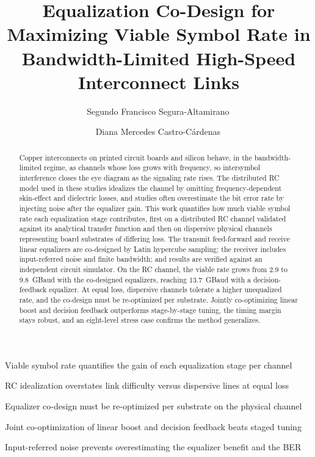 \documentclass[preprint,review,12pt]{elsarticle}
\begin{document}
\begin{frontmatter}

\title{Equalization Co-Design for Maximizing Viable Symbol Rate in Bandwidth-Limited High-Speed Interconnect Links}

\author[inst1]{Segundo Francisco Segura-Altamirano\,}

\author[inst1]{Diana Mercedes Castro-C\'ardenas\,}



\begin{abstract}
Copper interconnects on printed circuit boards and silicon behave, in the
bandwidth-limited regime, as channels whose loss grows with frequency, so
intersymbol interference closes the eye diagram as the signaling rate
rises. The distributed RC model used in these studies idealizes the
channel by omitting frequency-dependent skin-effect and dielectric losses,
and studies often overestimate the bit error rate by injecting noise after
the equalizer gain. This work quantifies how much viable symbol rate each
equalization stage contributes, first on a distributed RC channel
validated against its analytical transfer function and then on dispersive
physical channels representing board substrates of differing loss. The
transmit feed-forward and receive linear equalizers are co-designed by
Latin hypercube sampling; the receiver includes input-referred noise and
finite bandwidth; and results are verified against an independent circuit
simulator. On the RC channel, the viable rate grows from 2.9 to 9.8~GBaud
with the co-designed equalizers, reaching 13.7~GBaud with a
decision-feedback equalizer. At equal loss, dispersive channels tolerate a
higher unequalized rate, and the co-design must be re-optimized per
substrate. Jointly co-optimizing linear boost and decision feedback
outperforms stage-by-stage tuning, the timing margin stays robust, and an
eight-level stress case confirms the method generalizes.
\end{abstract}

\begin{highlights}
\item Viable symbol rate quantifies the gain of each equalization stage per channel
\item RC idealization overstates link difficulty versus dispersive lines at equal loss
\item Equalizer co-design must be re-optimized per substrate on the physical channel
\item Joint co-optimization of linear boost and decision feedback beats staged tuning
\item Input-referred noise prevents overestimating the equalizer benefit and the BER
\end{highlights}


\end{frontmatter}
\end{document}
